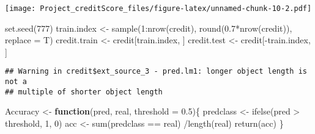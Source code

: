 \documentclass[
]{article}
\newenvironment{Shaded}{\begin{snugshade}}{\end{snugshade}}
\newcommand{\AttributeTok}[1]{\textcolor[rgb]{0.77,0.63,0.00}{#1}}
\newcommand{\ControlFlowTok}[1]{\textcolor[rgb]{0.13,0.29,0.53}{\textbf{#1}}}
\newcommand{\DecValTok}[1]{\textcolor[rgb]{0.00,0.00,0.81}{#1}}
\newcommand{\FloatTok}[1]{\textcolor[rgb]{0.00,0.00,0.81}{#1}}
\newcommand{\FunctionTok}[1]{\textcolor[rgb]{0.00,0.00,0.00}{#1}}
\newcommand{\NormalTok}[1]{#1}
\newcommand{\OtherTok}[1]{\textcolor[rgb]{0.56,0.35,0.01}{#1}}
\newcommand{\SpecialCharTok}[1]{\textcolor[rgb]{0.00,0.00,0.00}{#1}}
\begin{document}
\texttt{[image: Project\_creditScore\_files/figure-latex/unnamed-chunk-10-2.pdf]}

\begin{Shaded}
\begin{Highlighting}[]
\FunctionTok{set.seed}\NormalTok{(}\DecValTok{777}\NormalTok{)}
\NormalTok{train.index }\OtherTok{\textless{}{-}} \FunctionTok{sample}\NormalTok{(}\DecValTok{1}\SpecialCharTok{:}\FunctionTok{nrow}\NormalTok{(credit), }\FunctionTok{round}\NormalTok{(}\FloatTok{0.7}\SpecialCharTok{*}\FunctionTok{nrow}\NormalTok{(credit)), }\AttributeTok{replace =}\NormalTok{ T)}
\NormalTok{credit.train }\OtherTok{\textless{}{-}}\NormalTok{ credit[train.index, ]}
\NormalTok{credit.test }\OtherTok{\textless{}{-}}\NormalTok{ credit[}\SpecialCharTok{{-}}\NormalTok{train.index, ]}
\end{Highlighting}
\end{Shaded}

\begin{Shaded}
\end{Shaded}

\begin{verbatim}
## Warning in credit$ext_source_3 - pred.lm1: longer object length is not a
## multiple of shorter object length
\end{verbatim}

\begin{Shaded}
\begin{Highlighting}[]
\NormalTok{Accuracy }\OtherTok{\textless{}{-}} \ControlFlowTok{function}\NormalTok{(pred, real, }\AttributeTok{threshold =} \FloatTok{0.5}\NormalTok{)\{}
\NormalTok{  predclass }\OtherTok{\textless{}{-}} \FunctionTok{ifelse}\NormalTok{(pred }\SpecialCharTok{\textgreater{}}\NormalTok{ threshold, }\DecValTok{1}\NormalTok{, }\DecValTok{0}\NormalTok{)}
\NormalTok{  acc }\OtherTok{\textless{}{-}} \FunctionTok{sum}\NormalTok{(predclass }\SpecialCharTok{==}\NormalTok{ real) }\SpecialCharTok{/}\FunctionTok{length}\NormalTok{(real)}
  \FunctionTok{return}\NormalTok{(acc)}
\NormalTok{\}}
\end{Highlighting}
\end{Shaded}
\end{document}
